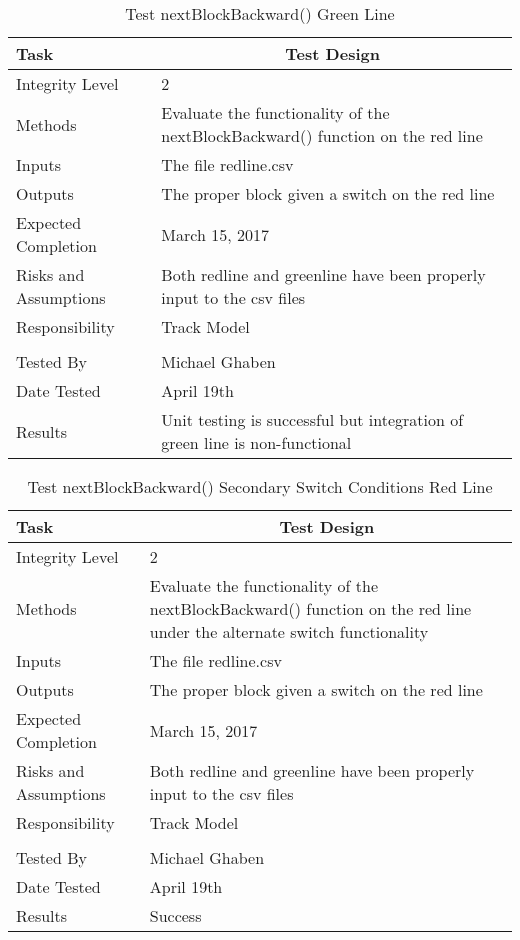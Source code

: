 \documentclass[]{article}
\begin{document}
\begin{table}[H]
	\centering
	\caption{Test nextBlockBackward() Green Line}
	\begin{tabular}{|l|l|}
		\hline
		Task & \multicolumn{1}{c|}{Test Design} \\ \hline
		Integrity Level & 2 \\ \hline
		Methods & \parbox[t]{10cm}{Evaluate the functionality of the nextBlockBackward() function on the red line} \\ \hline
		Inputs &  The file redline.csv \\ \hline
		Outputs &  The proper block given a switch on the red line\\ \hline
		Expected Completion & March 15, 2017\\ \hline
		Risks and Assumptions & Both redline and greenline have been properly input to the csv files \\ \hline
		Responsibility & Track Model\\ \hline
		\\ \hline
		Tested By   &  Michael Ghaben\\	\hline
		Date Tested & \parbox[t]{10cm}{April 19th}\\ \hline
		Results &\parbox[t]{10cm}{ Unit testing is successful but integration of green line is non-functional}\\ \hline
	\end{tabular}
\end{table}

\begin{table}[H]
	\centering
	\caption{Test nextBlockBackward() Secondary Switch Conditions Red Line}
	\begin{tabular}{|l|l|}
		\hline
		Task & \multicolumn{1}{c|}{Test Design} \\ \hline
		Integrity Level & 2 \\ \hline
		Methods & \parbox[t]{10cm}{Evaluate the functionality of the nextBlockBackward() function on the red line under the alternate switch functionality}\\ \hline
		Inputs &  The file redline.csv \\ \hline
		Outputs &  The proper block given a switch on the red line\\ \hline
		Expected Completion & March 15, 2017\\ \hline
		Risks and Assumptions & Both redline and greenline have been properly input to the csv files \\ \hline
		Responsibility & Track Model\\ \hline
		\\ \hline
		Tested By   &  Michael Ghaben\\	\hline
		Date Tested & \parbox[t]{10cm}{April 19th}\\ \hline
		Results & Success\\ \hline
	\end{tabular}
\end{table}
\end{document}
